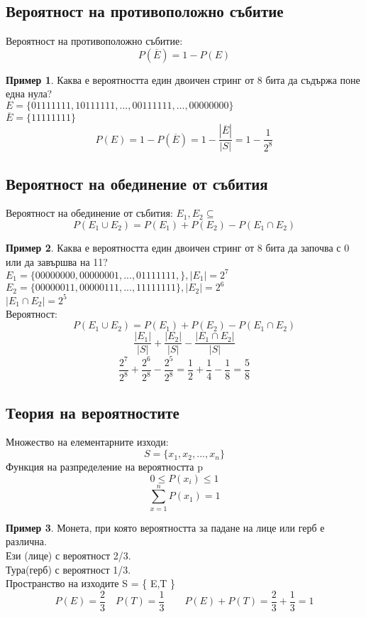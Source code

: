 \documentclass[fleqn, 12pt]{article}
\theoremstyle{definition}
\newtheorem{example}{Пример}[subsection]
\begin{document}
\subsection{Вероятност на противоположно събитие}
Вероятност на противоположно събитие:
$$P(\overline{E}) = 1 - P(E)$$

\begin{example}
Каква е вероятността един двоичен стринг от 8 бита да съдържа поне една нула?\\
$E = \{01111111, 10111111, ..., 00111111, ...,  00000000\}$\\
$\overline{E} = \{11111111 \}$
$$P(E) = 1 - P(\overline{E}) = 1 - \frac{|\overline{E}|}{|S|} = 1 - \frac{1}{2^8}$$
\end{example}

\subsection{Вероятност на обединение от събития}
Вероятност на обединение от събития: $E_1, E_2 \subseteq$
$$P(E_1 \cup E_2) = P(E_1) + P(E_2) - P(E_1 \cap E_2)$$

\begin{example}
Каква е вероятността един двоичен стринг от 8 бита да започва с 0 или да завършва на 11? \\
$E_1 = \{00000000, 00000001, ..., 01111111,\}, |E_1| = 2^7$\\
$E_2 = \{ 00000011, 00000111, ..., 11111111\}, |E_2| = 2^6$ \\
$|E_1 \cap E_2| = 2^5$\\
Вероятност: 
$$P(E_1 \cup E_2) = P(E_1) + P(E_2) - P(E_1 \cap E_2) $$ 
$$\frac{|E_1|}{|S|} + \frac{|E_2|}{|S|} - \frac{|E_1 \cap E_2|}{|S|}$$
$$\frac{2^7}{2^8} + \frac{2^6}{2^8} - \frac{2^5}{2^8} = \frac{1}{2} + \frac{1}{4} - \frac{1}{8} = \frac{5}{8}$$
\end{example}

\subsection{Теория на вероятностите}
Множество на елементарните изходи:
$$S = \{x_1, x_2, ..., x_n \}$$
Функция на разпределение на вероятността p
$$0 \leq P(x_i) \leq 1$$
$$\sum_{x =1} ^n P(x_1) = 1$$

\begin{example}
Монета, при която вероятността за падане на лице или герб е различна.\\
Ези (лице) с вероятност 2/3.\\
Тура(герб) с вероятност 1/3. \\
Пространство на изходите S = \{ E,T \} \\
$$P(E) = \frac{2}{3} \quad P(T) = \frac{1}{3} \qquad P(E) + P(T) = \frac{2}{3} + \frac{1}{3} = 1$$
\end{example}
\end{document}
